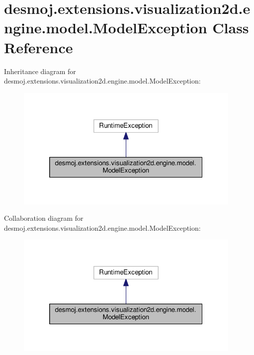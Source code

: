 \section{desmoj.\-extensions.\-visualization2d.\-engine.\-model.\-Model\-Exception Class Reference}
\label{classdesmoj_1_1extensions_1_1visualization2d_1_1engine_1_1model_1_1_model_exception}


Inheritance diagram for desmoj.\-extensions.\-visualization2d.\-engine.\-model.\-Model\-Exception\-:
\nopagebreak
\begin{figure}[H]
\begin{center}
\leavevmode
\includegraphics[width=308pt]{classdesmoj_1_1extensions_1_1visualization2d_1_1engine_1_1model_1_1_model_exception__inherit__graph}
\end{center}
\end{figure}


Collaboration diagram for desmoj.\-extensions.\-visualization2d.\-engine.\-model.\-Model\-Exception\-:
\nopagebreak
\begin{figure}[H]
\begin{center}
\leavevmode
\includegraphics[width=308pt]{classdesmoj_1_1extensions_1_1visualization2d_1_1engine_1_1model_1_1_model_exception__coll__graph}
\end{center}
\end{figure}
